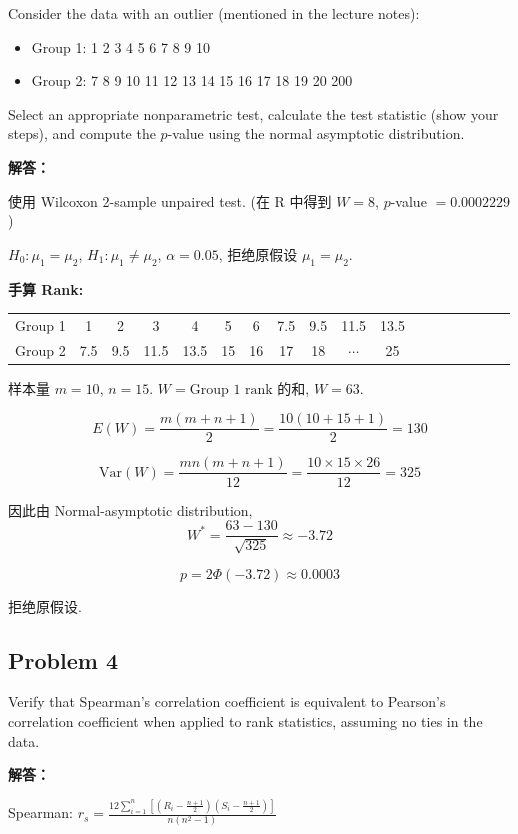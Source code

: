 Consider the data with an outlier (mentioned in the lecture notes):
\begin{itemize}
\item Group 1: 1 2 3 4 5 6 7 8 9 10
\item Group 2: 7 8 9 10 11 12 13 14 15 16 17 18 19 20 200
\end{itemize}
Select an appropriate nonparametric test, calculate the test statistic (show your steps), and compute the $p$-value using the normal asymptotic distribution.

\textbf{解答：}

使用 Wilcoxon 2-sample unpaired test. (在 R 中得到 $W = 8$, $p$-value $= 0.0002229$)

$H_0: \mu_1 = \mu_2$, $H_1: \mu_1 \neq \mu_2$, $\alpha = 0.05$, 拒绝原假设 $\mu_1 = \mu_2$.

\textbf{手算 Rank:}

\begin{center}
\begin{tabular}{c|ccccccccccccccccc}
Group 1 & 1 & 2 & 3 & 4 & 5 & 6 & 7.5 & 9.5 & 11.5 & 13.5 & & & & & & & \\
Group 2 & 7.5 & 9.5 & 11.5 & 13.5 & 15 & 16 & 17 & 18 & $\cdots$ & 25 & & & & & & & \\
\end{tabular}
\end{center}

样本量 $m = 10$, $n = 15$. $W = \text{Group 1 rank 的和}$, $W = 63$.

\[
E(W) = \frac{m(m+n+1)}{2} = \frac{10(10+15+1)}{2} = 130
\]

\[
\text{Var}(W) = \frac{mn(m+n+1)}{12} = \frac{10 \times 15 \times 26}{12} = 325
\]

因此由 Normal-asymptotic distribution,
\[
W^* = \frac{63 - 130}{\sqrt{325}} \approx -3.72
\]

\[
p = 2\Phi(-3.72) \approx 0.0003
\]

拒绝原假设.

\subsection{Problem 4}

Verify that Spearman's correlation coefficient is equivalent to Pearson's correlation coefficient when applied to rank statistics, assuming no ties in the data.

\textbf{解答：}

Spearman: $r_s = \frac{12 \sum_{i=1}^{n} \left[(R_i - \frac{n+1}{2})(S_i - \frac{n+1}{2})\right]}{n(n^2 - 1)}$

